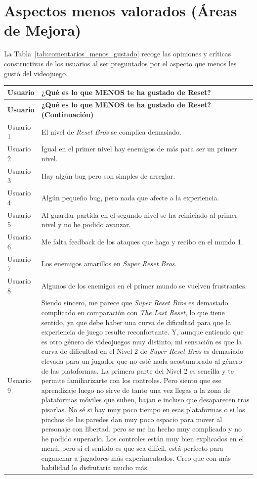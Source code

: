 \newpage

\section{Aspectos menos valorados (Áreas de Mejora)}
La Tabla~\ref{tab:comentarios_menos_gustado} recoge las opiniones y críticas constructivas de los usuarios al ser preguntados por el aspecto que menos les gustó del videojuego.

\begin{longtable}{|l|p{12.5cm}|}
\hline
\textbf{Usuario} & \textbf{¿Qué es lo que MENOS te ha gustado de Reset?} \\ \hline
\endfirsthead
\hline
\textbf{Usuario} & \textbf{¿Qué es lo que MENOS te ha gustado de Reset? (Continuación)} \\ \hline
\endhead
\hline
\endfoot
\hline
\endlastfoot
Usuario 1 & El nivel de \textit{Reset Bros} se complica demasiado. \\ \hline
Usuario 2 & Igual en el primer nivel hay enemigos de más para ser un primer nivel. \\ \hline
Usuario 3 & Hay algún bug pero son simples de arreglar. \\ \hline
Usuario 4 & Algún pequeño bug, pero nada que afecte a la experiencia. \\ \hline
Usuario 5 & Al guardar partida en el segundo nivel se ha reiniciado al primer nivel y no he podido avanzar. \\ \hline
Usuario 6 & Me falta feedback de los ataques que hago y recibo en el mundo 1. \\ \hline
Usuario 7 & Los enemigos amarillos en \textit{Super Reset Bros}. \\ \hline
Usuario 8 & Algunos de los enemigos en el primer mundo se vuelven frustrantes. \\ \hline
Usuario 9 & Siendo sincero, me parece que \textit{Super Reset Bros} es demasiado complicado en comparación con \textit{The Last Reset}, lo que tiene sentido, ya que debe haber una curva de dificultad para que la experiencia de juego resulte reconfortante. Y, aunque entiendo que es otro género de videojuegos muy distinto, mi sensación es que la curva de dificultad en el Nivel 2 de \textit{Super Reset Bros} es demasiado elevada para un jugador que no esté nada acostumbrado al género de las plataformas. La primera parte del Nivel 2 es sencilla y te permite familiarizarte con los controles. Pero siento que ese aprendizaje luego no sirve de tanto una vez llegas a la zona de plataformas móviles que suben, bajan e incluso que desaparecen tras pisarlas. No sé si hay muy poco tiempo en esas plataformas o si los pinchos de las paredes dan muy poco espacio para mover al personaje con libertad, pero se me ha hecho muy complicado y no he podido superarlo. Los controles están muy bien explicados en el menú, pero si el sentido es que sea difícil, está perfecto para enganchar a jugadores más experimentados. Creo que con más habilidad lo disfrutaría mucho más. \\ \hline

\end{longtable}

